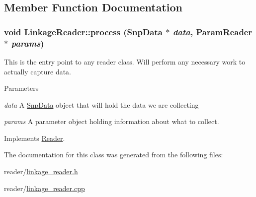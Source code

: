 \subsection{Member Function Documentation}
\hypertarget{classLinkageReader_a808d3be4b0a2b3af8a7ec7fea963960b}{
\subsubsection[{process}]{\setlength{\rightskip}{0pt plus 5cm}void LinkageReader::process ({\bf SnpData} $\ast$ {\em data}, \/  {\bf ParamReader} $\ast$ {\em params})}}
\label{classLinkageReader_a808d3be4b0a2b3af8a7ec7fea963960b}
This is the entry point to any reader class. Will perform any necessary work to actually capture data.


\begin{DoxyParams}{Parameters}
\item[{\em data}]A \hyperlink{classSnpData}{SnpData} object that will hold the data we are collecting \item[{\em params}]A parameter object holding information about what to collect. \end{DoxyParams}


Implements \hyperlink{classReader_a334a724f607c84262af67759ffcdbd26}{Reader}.



The documentation for this class was generated from the following files:\begin{DoxyCompactItemize}
\item 
reader/\hyperlink{linkage__reader_8h}{linkage\_\-reader.h}\item 
reader/\hyperlink{linkage__reader_8cpp}{linkage\_\-reader.cpp}\end{DoxyCompactItemize}
